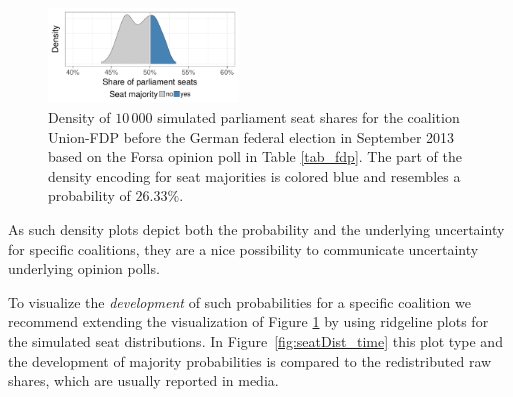 \documentclass[smallcondensed]{svjour3}     %
\begin{document}
\begin{figure}[H]\centering
\includegraphics[width=0.45\textwidth]{figures/2013_forsa_cdufdp_lastPreelectionPoll.pdf}
\caption{Density of $10\,000$ simulated parliament seat shares for the coalition Union-FDP before the German federal election in September 2013 based on the Forsa opinion poll in Table \ref{tab_fdp}. The part of the density encoding for seat majorities is colored blue and resembles a probability of $26.33\%$.
\label{fig:seatDist}
}
\end{figure}

As such density plots depict both the probability and the underlying
uncertainty for specific coalitions, they are a nice possibility to communicate
uncertainty underlying opinion polls.

To visualize the {\it development} of such probabilities
for a specific coalition we recommend extending the visualization of Figure \ref{fig:seatDist} by using ridgeline plots \citep{wilke_2017} for the simulated seat distributions. In Figure~\ref{fig:seatDist_time} this plot type and the development of majority probabilities is compared to
the redistributed raw shares, which are usually reported in media.
\end{document}
